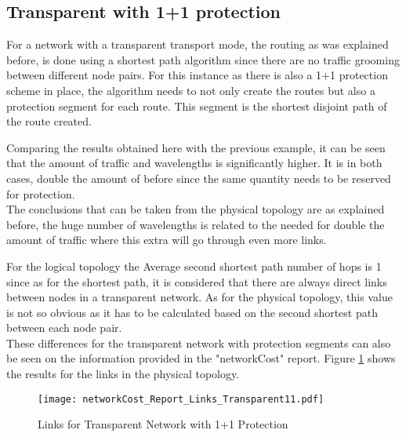 	
	
		\subsection{Transparent with 1+1 protection}
		
		
		For a network with a transparent transport mode, the routing as was explained before, is done using a shortest path algorithm since there are no traffic grooming between different node pairs. For this instance as there is also a 1+1 protection scheme in place, the algorithm needs to not only create the routes but also a protection segment for each route. This segment is the shortest disjoint path of the route created.

		
		Comparing the results obtained here with the previous example, it can be seen that the amount of traffic and wavelengths is significantly higher. It is in both cases, double the amount of before since the same quantity needs to be reserved for protection.\\
		

		
		The conclusions that can be taken from the physical topology are as explained before, the huge number of wavelengths is related to the needed for double the amount of traffic where this extra will go through even more links.
		
		For the logical topology the Average second shortest path number of hops is 1 since as for the shortest path, it is considered that there are always direct links between nodes in a transparent network. As for the physical topology, this value is not so obvious as it has to be calculated based on the second shortest path between each node pair. \\
		
			
	
			
		These differences for the transparent network with protection segments can also be seen on the information provided in the "networkCost" report. Figure \ref{networkCost_Report_Links_Transparent11} shows the results for the links in the physical topology.\\
		
		\begin{figure}[!h]
			\centering
			\texttt{[image: networkCost\_Report\_Links\_Transparent11.pdf]}
			\caption{Links for Transparent Network with 1+1 Protection}
			\label{networkCost_Report_Links_Transparent11}						
		\end{figure}	
		
